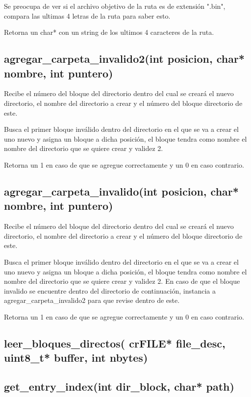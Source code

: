 \documentclass[12pt]{article}
\begin{document}
Se preocupa de ver si el archivo objetivo de la ruta es de extensión ".bin", compara las ultimas 4 letras de la ruta para saber esto.

Retorna un char* con un string de los ultimos 4 caracteres de la ruta.

\subsection{agregar\_carpeta\_invalido2(int posicion, char* nombre, int puntero)}
Recibe el número del bloque del directorio dentro del cual se creará el nuevo directorio, el nombre del directorio a crear y el número del bloque directorio de este.

Busca el primer bloque inválido dentro del directorio en el que se va a crear el uno nuevo y asigna un bloque a dicha posición, el bloque tendra como nombre el nombre del directorio que se quiere crear y validez 2.

Retorna un 1 en caso de que se agregue correctamente y un 0 en caso contrario.


\subsection{agregar\_carpeta\_invalido(int posicion, char* nombre, int puntero)}
Recibe el número del bloque del directorio dentro del cual se creará el nuevo directorio, el nombre del directorio a crear y el número del bloque directorio de este.

Busca el primer bloque inválido dentro del directorio en el que se va a crear el uno nuevo y asigna un bloque a dicha posición, el bloque tendra como nombre el nombre del directorio que se quiere crear y validez 2. En caso de que el bloque invalido se encuentre dentro del directorio de continuación, instancia a agregar\_carpeta\_invalido2 para que revise dentro de este.

Retorna un 1 en caso de que se agregue correctamente y un 0 en caso contrario.

\subsection{leer\_bloques\_directos( crFILE* file\_desc, uint8\_t* buffer, int nbytes)}

\subsection{get\_entry\_index(int dir\_block, char* path)}
\end{document}
